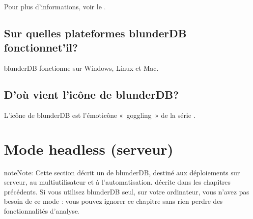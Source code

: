 \documentclass[letterpaper,10pt,french]{sphinxmanual}
\begin{document}
\sphinxAtStartPar
Pour plus d’informations, voir le .


\subsection{Sur quelles plateformes blunderDB fonctionne\sphinxhyphen{}t’il?}
\label{\detokenize{faq:sur-quelles-plateformes-blunderdb-fonctionne-t-il}}
\sphinxAtStartPar
blunderDB fonctionne sur Windows, Linux et Mac.


\subsection{D’où vient l’icône de blunderDB?}
\label{\detokenize{faq:d-ou-vient-l-icone-de-blunderdb}}
\sphinxAtStartPar
L’icône de blunderDB est l’émoticône « goggling » de la série .

\sphinxstepscope


\section{Mode headless (serveur)}
\label{\detokenize{mode_headless:mode-headless-serveur}}\label{\detokenize{mode_headless:headless}}\label{\detokenize{mode_headless::doc}}
\begin{sphinxadmonition}{note}{Note:}
\sphinxAtStartPar
Cette section décrit un  de blunderDB,
destiné aux déploiements sur serveur, au multi\sphinxhyphen{}utilisateur et à
l’automatisation.  décrite dans les chapitres précédents. Si vous
utilisez blunderDB seul, sur votre ordinateur, vous n’avez pas besoin de ce
mode : vous pouvez ignorer ce chapitre sans rien perdre des fonctionnalités
d’analyse.
\end{sphinxadmonition}
\end{document}

